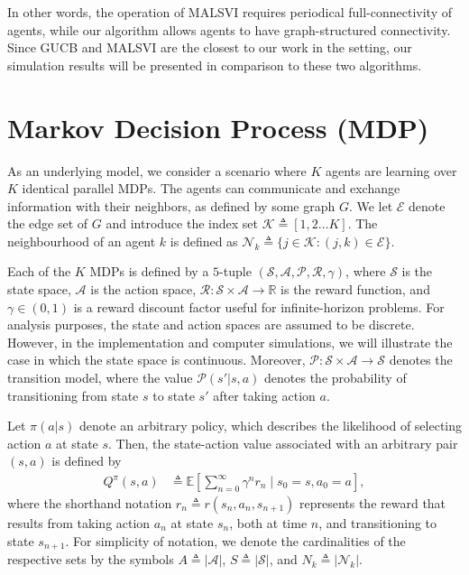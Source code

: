 \documentclass[lettersize,journal]{IEEEtran}
\begin{document}
In other words, the operation of MALSVI requires periodical full-connectivity of agents, while our algorithm allows agents to have graph-structured connectivity. Since GUCB and MALSVI are the closest to our work in the setting, our simulation results will be presented in comparison to these two algorithms. 
 
\section{Markov Decision Process (MDP)}
\label{sec:preliminaries}
As an underlying model, we consider a scenario where $K$ agents are learning over $K$ identical parallel MDPs. %
 The agents can communicate and exchange information with their neighbors, as defined by some graph $G$. We let $\mathcal{E}$ denote the edge set of $G$ and introduce the index set $\mathcal{K}\triangleq [1,2 \ldots K]$. The neighbourhood of an agent $k$ is defined as $\mathcal{N}_k\triangleq\{j \in \mathcal{K}: (j,k) \in \mathcal{E}\}$. \par 
Each of the $K$ MDPs is defined
by a $5$-tuple $(\mathcal{S}, \mathcal{A}, \mathcal{P}, \mathcal{R},\gamma)$, where $\mathcal{S}$ is the state space, $\mathcal{A}$ is the action space,  $\mathcal{R}:\mathcal{S} \times \mathcal{A} \to \mathbb{R}$ is the reward function, and $\gamma\in(0,1)$ is a reward discount factor useful for infinite-horizon problems. For analysis purposes, the  state and action spaces are assumed to be discrete. However, in the implementation and computer simulations, we will illustrate the case in which the state space is continuous. Moreover, $\mathcal{P}:\mathcal{S} \times \mathcal{A} \to \mathcal{S}$ denotes the transition model, where the value $\mathcal{P}(s'|s,a)$ denotes the probability of transitioning from state $s$ to state $s'$ after taking action $a$.\par 
Let $\pi(a|s)$ denote an arbitrary policy, which describes the likelihood of selecting action $a$ at state $s$. Then, the state-action value associated with an arbitrary pair $(s,a)$ is defined by
\begin{align}
\label{eq:Q}
    Q^{\pi}(s, a)&\triangleq \mathbb{E}\left[\sum_{n=0}^{\infty} \gamma^n r_n \mid s_{0}=s, a_0=a\right] ,
\end{align}
where the shorthand notation $r_n\triangleq r(s_n,a_n,s_{n+1})$ represents the reward that results from taking action $a_n$ at state $s_n$, both at time $n$, and transitioning to state $s_{n+1}$. For simplicity of notation, we denote the cardinalities of the respective sets by the symbols $A\triangleq|\mathcal{A}|$, $S\triangleq|\mathcal{S}|$, and  $N_k\triangleq|\mathcal{N}_k|$.  \par 
\end{document}
